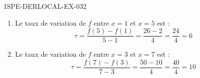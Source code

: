 \begin{corrige}{1SPE-DERLOCAL-EX-032}
\begin{enumerate}
\item Le taux de variation de $f$ entre $x=1$ et $x=5$ est :
\[
\tau = \frac{f(5) - f(1)}{5 - 1} = \frac{26 - 2}{4} = \frac{24}{4} = \boxed{6}
\]

\item Le taux de variation de $f$ entre $x=3$ et $x=7$ est :
\[
\tau = \frac{f(7) - f(3)}{7 - 3} = \frac{50 - 10}{4} = \frac{40}{4} = \boxed{10}
\]
\end{enumerate}
\end{corrige}
